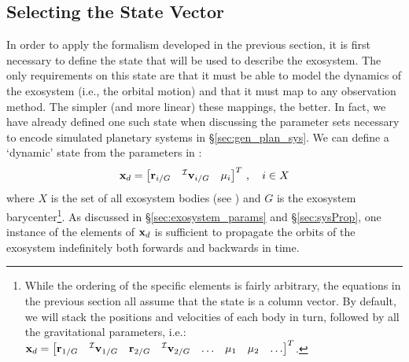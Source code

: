 \subsection{Selecting the State Vector}\label{sec:state_selection}
In order to apply the formalism developed in the previous section, it is first necessary to define the state that will be used to describe the exosystem.  The only requirements on this state are that it must be able to model the dynamics of the exosystem (i.e., the orbital motion) and that it must map to any observation method.  The simpler (and more linear) these mappings, the better.  In fact, we have already defined one such state when discussing the parameter sets necessary to encode simulated planetary systems in \S\ref{sec:gen_plan_sys}.  We can define a `dynamic' state from the parameters in :
\begin{equation}
\mathbf x_d = \begin{bmatrix} \mathbf r_{i/G} &  {}^\mathcal I \mathbf v_{i/G}& \mu_i \end{bmatrix}^T\,, \quad i \in X
\end{equation}
where $X$ is the set of all exosystem bodies (see ) and $G$ is the exosystem barycenter\footnote{While the ordering of the specific elements is fairly arbitrary, the equations in the previous section all assume that the state is a column vector. By default, we will stack the positions and velocities of each body in turn, followed by all the gravitational parameters, i.e.: $\mathbf x_d = \begin{bmatrix} \mathbf r_{1/G} & {}^\mathcal I \mathbf v_{1/G}& \mathbf r_{2/G} & {}^\mathcal I \mathbf v_{2/G}&\ldots  &\mu_1 & \mu_2 &\ldots \end{bmatrix}^T$.}.  As discussed in \S\ref{sec:exosystem_params} and \S\ref{sec:sysProp}, one instance of the elements of $\mathbf x_d$ is sufficient to propagate the orbits of the exosystem indefinitely both forwards and backwards in time.

